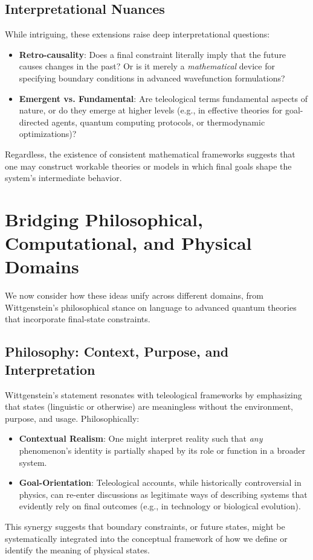 \documentclass[11pt]{article}
\begin{document}
\subsection{Interpretational Nuances}
While intriguing, these extensions raise deep interpretational questions:
\begin{itemize}
    \item \textbf{Retro-causality}: Does a final constraint literally imply that the future causes changes in the past? Or is it merely a \emph{mathematical} device for specifying boundary conditions in advanced wavefunction formulations?
    \item \textbf{Emergent vs. Fundamental}: Are teleological terms fundamental aspects of nature, or do they emerge at higher levels (e.g., in effective theories for goal-directed agents, quantum computing protocols, or thermodynamic optimizations)?
\end{itemize}
Regardless, the existence of consistent mathematical frameworks suggests that one may construct workable theories or models in which final goals shape the system’s intermediate behavior.

\section{Bridging Philosophical, Computational, and Physical Domains}
\label{sec:philo_comp_phys}
We now consider how these ideas unify across different domains, from Wittgenstein’s philosophical stance on language to advanced quantum theories that incorporate final-state constraints.

\subsection{Philosophy: Context, Purpose, and Interpretation}
Wittgenstein’s statement resonates with teleological frameworks by emphasizing that states (linguistic or otherwise) are meaningless without the environment, purpose, and usage. Philosophically:
\begin{itemize}
    \item \textbf{Contextual Realism}: One might interpret reality such that \emph{any} phenomenon’s identity is partially shaped by its role or function in a broader system.
    \item \textbf{Goal-Orientation}: Teleological accounts, while historically controversial in physics, can re-enter discussions as legitimate ways of describing systems that evidently rely on final outcomes (e.g., in technology or biological evolution).
\end{itemize}
This synergy suggests that boundary constraints, or future states, might be systematically integrated into the conceptual framework of how we define or identify the meaning of physical states.
\end{document}
